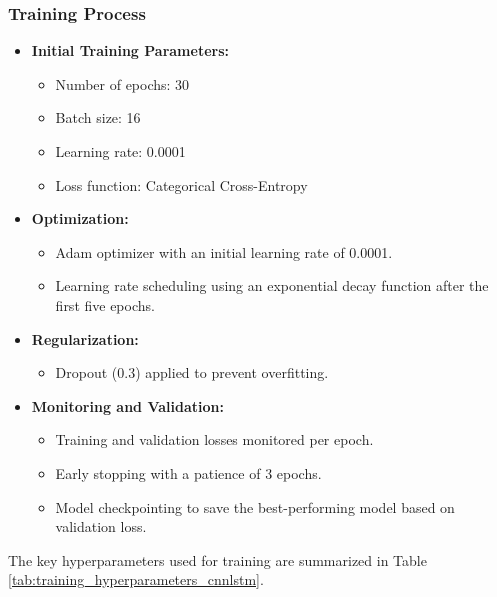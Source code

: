       \subsubsection{Training Process}
      \begin{itemize}
      \item \textbf{Initial Training Parameters:}
      \begin{itemize}
            \item Number of epochs: 30
            \item Batch size: 16
            \item Learning rate: 0.0001
            \item Loss function: Categorical Cross-Entropy
      \end{itemize}
      
      \item \textbf{Optimization:}
      \begin{itemize}
            \item Adam optimizer with an initial learning rate of 0.0001.
            \item Learning rate scheduling using an exponential decay function after the first five epochs.
      \end{itemize}
      
      \item \textbf{Regularization:}
      \begin{itemize}
            \item Dropout (0.3) applied to prevent overfitting.
      \end{itemize}
      
      \item \textbf{Monitoring and Validation:}
      \begin{itemize}
            \item Training and validation losses monitored per epoch.
            \item Early stopping with a patience of 3 epochs.
            \item Model checkpointing to save the best-performing model based on validation loss.
      \end{itemize}
      \end{itemize}

      The key hyperparameters used for training are summarized in Table \ref{tab:training_hyperparameters_cnnlstm}.

